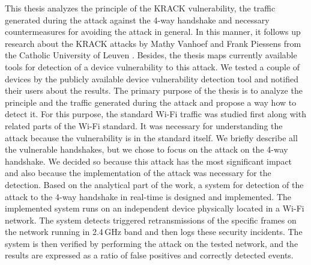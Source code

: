 This thesis analyzes the principle of the KRACK vulnerability, the traffic generated during the attack against the 4-way handshake and necessary countermeasures for avoiding the attack in general. In this manner, it follows up research about the KRACK attacks by Mathy Vanhoef and Frank Piessens from the Catholic University of Leuven \cite{VA_ccs2017, VA_ccs2018, VA17, VA18}. Besides, the thesis maps currently available tools for detection of a device vulnerability to this attack. We tested a couple of devices by the publicly available device vulnerability detection tool and notified their users about the results. The primary purpose of the thesis is to analyze the principle and the traffic generated during the attack and propose a way how to detect it. For this purpose, the standard Wi-Fi traffic was studied first along with related parts of the Wi-Fi standard. It was necessary for understanding the attack because the vulnerability is in the standard itself. We briefly describe all the vulnerable handshakes, but we chose to focus on the attack on the 4-way handshake. We decided so because this attack has the most significant impact and also because the implementation of the attack was necessary for the detection. Based on the analytical part of the work, a system for detection of the attack to the 4-way handshake in real-time is designed and implemented. The implemented system runs on an independent device physically located in a Wi-Fi network. The system detects triggered retransmissions of the specific frames on the network running in 2.4\,GHz band and then logs these security incidents. The system is then verified by performing the attack on the tested network, and the results are expressed as a ratio of false positives and correctly detected events.


